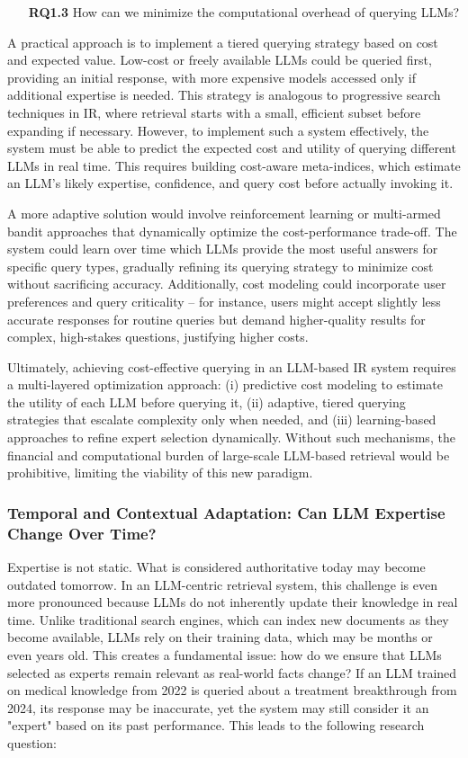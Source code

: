\begin{itemize}
    \item [\textbf{RQ1.3}] How can we minimize the computational overhead of querying LLMs?
\end{itemize}

A practical approach is to implement a tiered querying strategy based on cost and expected value. Low-cost or freely available LLMs could be queried first, providing an initial response, with more expensive models accessed only if additional expertise is needed. This strategy is analogous to progressive search techniques in IR, where retrieval starts with a small, efficient subset before expanding if necessary. However, to implement such a system effectively, the system must be able to predict the expected cost and utility of querying different LLMs in real time. This requires building cost-aware meta-indices, which estimate an LLM's likely expertise, confidence, and query cost before actually invoking it.

A more adaptive solution would involve reinforcement learning or multi-armed bandit approaches that dynamically optimize the cost-performance trade-off. The system could learn over time which LLMs provide the most useful answers for specific query types, gradually refining its querying strategy to minimize cost without sacrificing accuracy. Additionally, cost modeling could incorporate user preferences and query criticality -- for instance, users might accept slightly less accurate responses for routine queries but demand higher-quality results for complex, high-stakes questions, justifying higher costs.

Ultimately, achieving cost-effective querying in an LLM-based IR system requires a multi-layered optimization approach: (i) predictive cost modeling to estimate the utility of each LLM before querying it, (ii) adaptive, tiered querying strategies that escalate complexity only when needed, and (iii) learning-based approaches to refine expert selection dynamically. Without such mechanisms, the financial and computational burden of large-scale LLM-based retrieval would be prohibitive, limiting the viability of this new paradigm.

\subsubsection{Temporal and Contextual Adaptation: Can LLM Expertise Change Over Time?}
Expertise is not static. What is considered authoritative today may become outdated tomorrow. In an LLM-centric retrieval system, this challenge is even more pronounced because LLMs do not inherently update their knowledge in real time. Unlike traditional search engines, which can index new documents as they become available, LLMs rely on their training data, which may be months or even years old. This creates a fundamental issue: how do we ensure that LLMs selected as experts remain relevant as real-world facts change? If an LLM trained on medical knowledge from 2022 is queried about a treatment breakthrough from 2024, its response may be inaccurate, yet the system may still consider it an "expert" based on its past performance. This leads to the following research question:

